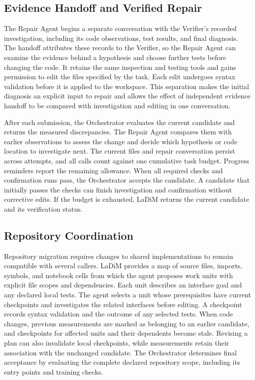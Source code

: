 \documentclass{article}
\begin{document}
\subsection{Evidence Handoff and Verified Repair}

The Repair Agent begins a separate conversation with the Verifier's recorded investigation, including its code observations, test results, and final diagnosis. The handoff attributes these records to the Verifier, so the Repair Agent can examine the evidence behind a hypothesis and choose further tests before changing the code. It retains the same inspection and testing tools and gains permission to edit the files specified by the task. Each edit undergoes syntax validation before it is applied to the workspace. This separation makes the initial diagnosis an explicit input to repair and allows the effect of independent evidence handoff to be compared with investigation and editing in one conversation.

After each submission, the Orchestrator evaluates the current candidate and returns the measured discrepancies. The Repair Agent compares them with earlier observations to assess the change and decide which hypothesis or code location to investigate next. The current files and repair conversation persist across attempts, and all calls count against one cumulative task budget. Progress reminders report the remaining allowance. When all required checks and confirmation runs pass, the Orchestrator accepts the candidate. A candidate that initially passes the checks can finish investigation and confirmation without corrective edits. If the budget is exhausted, LaDiM returns the current candidate and its verification status.

\subsection{Repository Coordination}
\label{sec:repository-method}

Repository migration requires changes to shared implementations to remain compatible with several callers. LaDiM provides a map of source files, imports, symbols, and notebook cells from which the agent proposes work units with explicit file scopes and dependencies. Each unit describes an interface goal and any declared local tests. The agent selects a unit whose prerequisites have current checkpoints and investigates the related interfaces before editing. A checkpoint records syntax validation and the outcome of any selected tests. When code changes, previous measurements are marked as belonging to an earlier candidate, and checkpoints for affected units and their dependents become stale. Revising a plan can also invalidate local checkpoints, while measurements retain their association with the unchanged candidate. The Orchestrator determines final acceptance by evaluating the complete declared repository scope, including its entry points and training checks.
\end{document}
